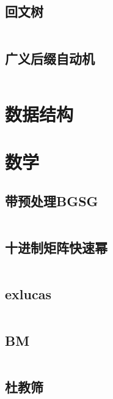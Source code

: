 \documentclass[a4paper,11pt]{article}
\begin{document}
\subsection{回文树}
\inputminted[breaklines]{c++}{String/pam.cpp}

\subsection{广义后缀自动机}
\inputminted[breaklines]{c++}{String/sam.cpp}




\newpage
\section{数据结构}











\newpage
\section{数学} %

\subsection{带预处理BGSG}
\inputminted[breaklines]{c++}{Math/BGSG.cpp}

\subsection{十进制矩阵快速幂}
\inputminted[breaklines]{c++}{Math/快速幂.cpp}

\subsection{exlucas}
\inputminted[breaklines]{c++}{Math/exlucas.cpp}

\subsection{BM}
\inputminted[breaklines]{c++}{Math/BM.cpp}

\subsection{杜教筛}
\inputminted[breaklines]{c++}{Math/杜教筛.cpp}
\end{document}
